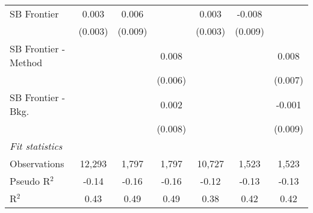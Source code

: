\begin{tabular}{lcccccc}
   SB Frontier          & 0.003        & 0.006       &         & 0.003        & -0.008  &   \\   
                        & (0.003)      & (0.009)     &         & (0.003)      & (0.009) &   \\   
   SB Frontier - Method &              &             & 0.008   &              &         & 0.008\\   
                        &              &             & (0.006) &              &         & (0.007)\\   
   SB Frontier - Bkg.   &              &             & 0.002   &              &         & -0.001\\   
                        &              &             & (0.008) &              &         & (0.009)\\   
   \midrule
   \emph{Fit statistics}\\
   Observations         & 12,293       & 1,797       & 1,797   & 10,727       & 1,523   & 1,523\\  
   Pseudo R$^2$         & -0.14        & -0.16       & -0.16   & -0.12        & -0.13   & -0.13\\  
   R$^2$                & 0.43         & 0.49        & 0.49    & 0.38         & 0.42    & 0.42\\  
   

\end{tabular}
